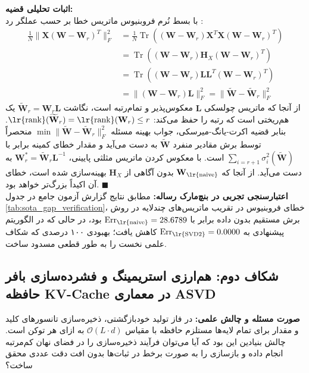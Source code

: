 \documentclass[12pt,a4paper]{report}
\theoremstyle{definition}
\begin{document}
\noindent \textbf{اثبات تحلیلی قضیه:}\\
با بسط نُرم فروبنیوس ماتریس خطا بر حسب عملگر رد :
\begin{align}
\frac{1}{N} \|\mathbf{X}(\mathbf{W} - \mathbf{W}_r)^T\|_F^2 &= \frac{1}{N} \operatorname{Tr}\left( (\mathbf{W} - \mathbf{W}_r)\mathbf{X}^T\mathbf{X}(\mathbf{W} - \mathbf{W}_r)^T \right) \nonumber \\
&= \operatorname{Tr}\left( (\mathbf{W} - \mathbf{W}_r)\mathbf{H}_X(\mathbf{W} - \mathbf{W}_r)^T \right) \nonumber \\
&= \operatorname{Tr}\left( (\mathbf{W} - \mathbf{W}_r)\mathbf{L}\mathbf{L}^T(\mathbf{W} - \mathbf{W}_r)^T \right) \nonumber \\
&= \|(\mathbf{W} - \mathbf{W}_r)\mathbf{L}\|_F^2 = \|\widetilde{\mathbf{W}} - \widetilde{\mathbf{W}}_r\|_F^2
\end{align}
از آنجا که ماتریس چولسکی $\mathbf{L}$ معکوس‌پذیر و تمام‌رتبه است، نگاشت $\widetilde{\mathbf{W}}_r = \mathbf{W}_r \mathbf{L}$ یک هم‌ریختی است که رتبه را حفظ می‌کند: $\text{\lr{rank}}(\widetilde{\mathbf{W}}_r) = \text{\lr{rank}}(\mathbf{W}_r) \le r$.
بنابر قضیه اکرت-یانگ-میرسکی، جواب بهینه مسئله $\min \|\widetilde{\mathbf{W}} - \widetilde{\mathbf{W}}_r\|_F^2$ منحصراً توسط برش مقادیر منفرد $\widetilde{\mathbf{W}}$ به دست می‌آید و مقدار خطای کمینه برابر با $\sum_{i=r+1} \sigma_i^2(\widetilde{\mathbf{W}})$ است. با معکوس کردن ماتریس مثلثی پایینی، $\mathbf{W}_r^* = \widetilde{\mathbf{W}}_r \mathbf{L}^{-1}$ به دست می‌آید. از آنجا که $\mathbf{W}_{\text{\lr{naive}}}$ بدون آگاهی از $\mathbf{H}_X$ بهینه‌سازی شده است، خطای آن اکیداً بزرگ‌تر خواهد بود. \hfill $\blacksquare$\\[0.2cm]

\textbf{اعتبارسنجی تجربی در بنچ‌مارک رساله:} مطابق نتایج گزارش آزمون جامع  در جدول \ref{tab:sota_gap_verification}، خطای فروبنیوس در تقریب ماتریس‌های چندلایه در روش برش مستقیم بدون داده برابر با $\text{Err}_{\text{\lr{naive}}} = 28.6789$ بود، در حالی که در الگوریتم پیشنهادی  به $\text{Err}_{\text{\lr{SVD2}}} = 0.0000$ کاهش یافت؛ بهبودی ۱۰۰ درصدی که شکاف علمی نخست را به طور قطعی مسدود ساخت.

\subsection{شکاف دوم: هم‌ارزی استریمینگ و فشرده‌سازی بافر حافظه KV-Cache در معماری ASVD}
\label{subsec:gap2_asvd_kv_cache}
\textbf{صورت مسئله و چالش علمی:} در فاز تولید خودبازگشتی، ذخیره‌سازی تانسورهای کلید و مقدار برای تمام لایه‌ها مستلزم حافظه با مقیاس $\mathcal{O}(L \cdot d)$ به ازای هر توکن است. چالش بنیادین این بود که آیا می‌توان فرآیند ذخیره‌سازی را در فضای نهان کم‌مرتبه انجام داده و بازسازی را به صورت برخط در ثبات‌ها  بدون افت دقت عددی محقق ساخت؟
\end{document}
